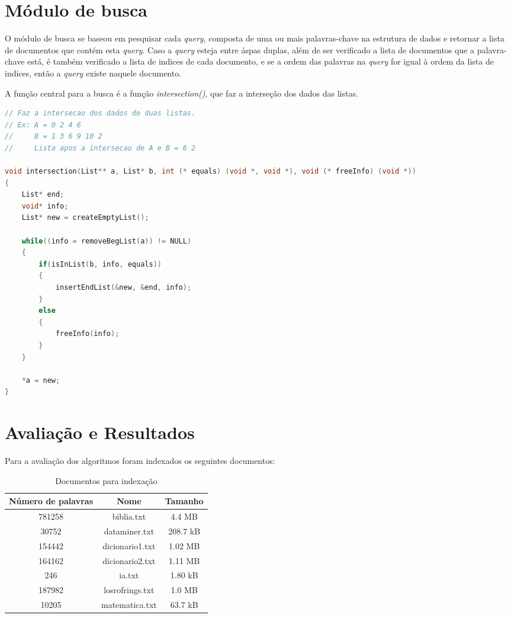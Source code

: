 \documentclass[a4paper,12pt]{article}
\begin{document}
\section{Módulo de busca}
O módulo de busca se baseou em pesquisar cada \emph{query}, composta de uma ou mais palavras-chave na estrutura de dados 
e retornar a lista de documentos que contém esta \emph{query}. Caso a \emph{query} esteja entre áspas duplas, além de ser verificado 
a lista de documentos que a palavra-chave está, é também verificado a lista de indices de cada documento, e se a ordem das palavras 
na \emph{query} for igual à ordem da lista de indices, então a \emph{query} existe naquele documento.

A função central para a busca é a função \emph{intersection()}, que faz a interseção dos dados das listas.

\begin{lstlisting}[language=C, caption=Função de interseção]
// Faz a intersecao dos dados de duas listas.
// Ex: A = 0 2 4 6
//     B = 1 3 6 9 10 2
//     Lista apos a intersecao de A e B = 6 2 

void intersection(List** a, List* b, int (* equals) (void *, void *), void (* freeInfo) (void *))
{
	List* end;
	void* info;
	List* new = createEmptyList();

	while((info = removeBegList(a)) != NULL) 
	{
		if(isInList(b, info, equals))
		{
			insertEndList(&new, &end, info);
		}
		else
		{
			freeInfo(info);
		}
	}

	*a = new;
}
\end{lstlisting}




\section{Avaliação e Resultados}

Para a avaliação dos algoritmos foram indexados os seguintes documentos:


\begin{table}[H]
\centering
\caption{Documentos para indexação}
\begin{tabular}{ccc}
\hline
Número de palavras & Nome & Tamanho \\
\hline
  781258 & biblia.txt      &  4.4 MB   \\
  30752 & dataminer.txt   &  208.7 kB  \\
  154442 & dicionario1.txt &  1.02 MB  \\
  164162 & dicionario2.txt &  1.11 MB  \\
  246 & ia.txt          &  1.80 kB     \\
  187982 & losrofrings.txt &  1.0 MB   \\
  10205 & matematica.txt  &  63.7 kB   \\
\hline
\end{tabular}
\end{table}
\end{document}
